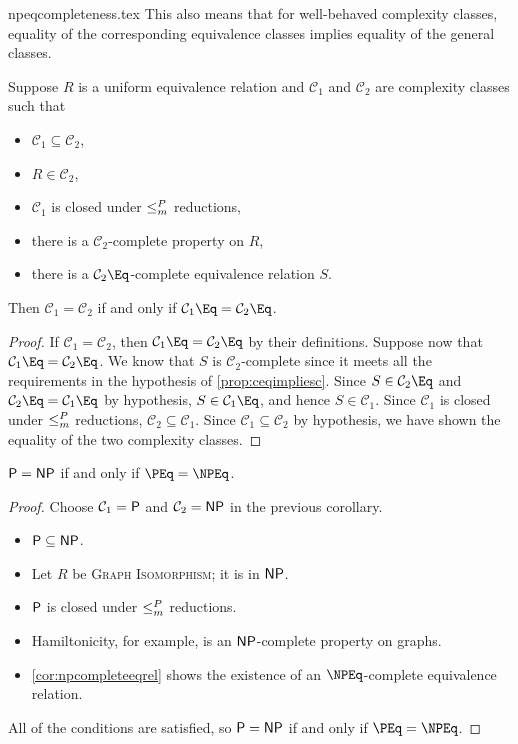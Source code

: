 \begin{filecontents}{npeqcompleteness.tex}
This also means that for well-behaved complexity classes, equality of the corresponding equivalence classes implies equality of the general classes.

\begin{proposition}
  Suppose $R$ is a uniform equivalence relation and $\mathcal{C}_1$ and $\mathcal{C}_2$ are complexity classes such that
  \begin{itemize}
  \item $\mathcal{C}_1 \subseteq \mathcal{C}_2$,
  \item $R \in \mathcal{C}_2$,
  \item $\mathcal{C}_1$ is closed under $\mor$ reductions,
  \item there is a $\mathcal{C}_2$-complete property on $R$,
  \item there is a $\mathcal{C}_2\Eq$-complete equivalence relation $S$.
  \end{itemize}
  Then $\mathcal{C}_1 = \mathcal{C}_2$ if and only if $\mathcal{C}_1\Eq = \mathcal{C}_2\Eq$.
\end{proposition}
\begin{proof}
  If $\mathcal{C}_1 = \mathcal{C}_2$, then $\mathcal{C}_1\Eq = \mathcal{C}_2\Eq$ by their definitions.
  Suppose now that $\mathcal{C}_1\Eq = \mathcal{C}_2\Eq$.
  We know that $S$ is $\mathcal{C}_2$-complete since it meets all the requirements in the hypothesis of \ref{prop:ceqimpliesc}.
  Since $S \in \mathcal{C}_2\Eq$ and $\mathcal{C}_2\Eq = \mathcal{C}_1\Eq$ by hypothesis, $S \in \mathcal{C}_1\Eq$, and hence $S \in \mathcal{C}_1$.
  Since $\mathcal{C}_1$ is closed under $\mor$ reductions, $\mathcal{C}_2 \subseteq \mathcal{C}_1$.
  Since $\mathcal{C}_1 \subseteq \mathcal{C}_2$ by hypothesis, we have shown the equality of the two complexity classes.
\end{proof}

\begin{corollary}\label{cor:pnppeqnpeq}
  $\P = \NP$ if and only if $\PEq = \NPEq$.
\end{corollary}
\begin{proof}
  Choose $\mathcal{C}_1 = \P$ and $\mathcal{C}_2 = \NP$ in the previous corollary.
  \begin{itemize}
  \item $\P \subseteq \NP$.
  \item Let $R$ be \textsc{Graph Isomorphism}; it is in $\NP$.
  \item $\P$ is closed under $\mor$ reductions.
  \item Hamiltonicity, for example, is an $\NP$-complete property on graphs.
  \item \ref{cor:npcompleteeqrel} shows the existence of an $\NPEq$-complete equivalence relation.
  \end{itemize}
  All of the conditions are satisfied, so $\P = \NP$ if and only if $\PEq = \NPEq$.
\end{proof}


\end{filecontents}
